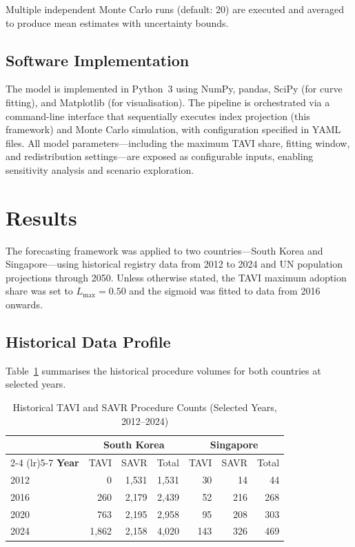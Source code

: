 \documentclass[12pt, a4paper]{article}
\begin{document}
Multiple independent Monte Carlo runs (default: 20) are executed and averaged to produce mean estimates with uncertainty bounds.

\subsection{Software Implementation}

The model is implemented in Python~3 using NumPy, pandas, SciPy (for curve fitting), and Matplotlib (for visualisation). The pipeline is orchestrated via a command-line interface that sequentially executes index projection (this framework) and Monte Carlo simulation, with configuration specified in YAML files. All model parameters---including the maximum TAVI share, fitting window, and redistribution settings---are exposed as configurable inputs, enabling sensitivity analysis and scenario exploration.


\section{Results}

The forecasting framework was applied to two countries---South Korea and Singapore---using historical registry data from 2012 to 2024 and UN population projections through 2050. Unless otherwise stated, the TAVI maximum adoption share was set to $L_{\max} = 0.50$ and the sigmoid was fitted to data from 2016 onwards.

\subsection{Historical Data Profile}

Table~\ref{tab:historical} summarises the historical procedure volumes for both countries at selected years.

\begin{table}[H]
\centering
\caption{Historical TAVI and SAVR Procedure Counts (Selected Years, 2012--2024)}
\label{tab:historical}
\smallskip
\begin{tabular}{@{}l rrr rrr@{}}
\toprule
& \multicolumn{3}{c}{\textbf{South Korea}} & \multicolumn{3}{c}{\textbf{Singapore}} \\
\cmidrule(lr){2-4} \cmidrule(lr){5-7}
\textbf{Year} & TAVI & SAVR & Total & TAVI & SAVR & Total \\
\midrule
2012 & 0     & 1{,}531 & 1{,}531 & 30  & 14  & 44  \\
2016 & 260   & 2{,}179 & 2{,}439 & 52  & 216 & 268 \\
2020 & 763   & 2{,}195 & 2{,}958 & 95  & 208 & 303 \\
2024 & 1{,}862 & 2{,}158 & 4{,}020 & 143 & 326 & 469 \\
\bottomrule
\end{tabular}
\end{table}
\end{document}
